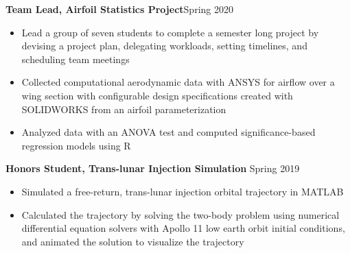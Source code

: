 \documentclass{article}
\begin{document}
\textbf{Team Lead, Airfoil Statistics Project}\hfill Spring 2020
\vspace{0.5em}
\begin{itemize}
	\item Lead a group of seven students to complete a semester long project by devising a project plan, delegating workloads, setting timelines, and scheduling team meetings
	\item Collected computational aerodynamic data with ANSYS for airflow over a wing section with configurable design specifications created with SOLIDWORKS from an airfoil parameterization
	\item Analyzed data with an ANOVA test and computed significance-based regression models using R 
\end{itemize}
\vspace{0.5em}
\textbf{Honors Student, Trans-lunar Injection Simulation} 
\hfill
Spring 2019
\vspace{0.5em}
\begin{itemize}
	\item Simulated a free-return, trans-lunar injection orbital trajectory in MATLAB
	\item Calculated the trajectory by solving the two-body problem using numerical differential equation solvers with Apollo 11 low earth orbit initial conditions, and animated the solution to visualize the trajectory 
\end{itemize}

\thispagestyle{empty}
\end{document}
